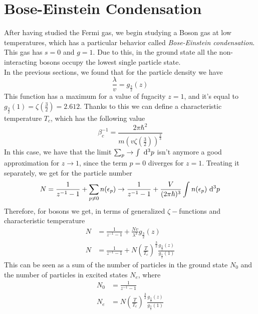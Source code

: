 \documentclass[../qm.tex]{subfiles}
\begin{document}
	\section{Bose-Einstein Condensation}
	After having studied the Fermi gas, we begin studying a Boson gas at low temperatures, which has a particular behavior called \textit{Bose-Einstein condensation}. This gas has $s=0$ and $g=1$. Due to this, in the ground state all the non-interacting bosons occupy the lowest single particle state.\\
	In the previous sections, we found that for the particle density we have
	\begin{equation}
		\frac{\lambda}{v}=g_{\frac{3}{2}}(z)
		\label{eq:particledensity}
	\end{equation}
	This function has a maximum for a value of fugacity $z=1$, and it's equal to $g_{\frac{3}{2}}(1)=\zeta(\frac{3}{2})=2.612$. Thanks to this we can define a characteristic temperature $T_c$, which has the following value
	\begin{equation}
		\beta_c^{-1}=\frac{2\pi\hbar^2}{m(v\zeta(\frac{3}{2}))^{\frac{2}{3}}}
		\label{eq:characteristictemp}
	\end{equation}
	In this case, we have that the limit $\sum_p\to\int\diff[3]{p}$ isn't anymore a good approximation for $z\to1$, since the term $p=0$ diverges for $z=1$. Treating it separately, we get for the particle number
	\begin{equation}
		N=\frac{1}{z^{-1}-1}+\sum_{p\ne0}n(\epsilon_p)\to\frac{1}{z^{-1}-1}+\frac{V}{(2\pi\hbar)^3}\int_{}^{}n(\epsilon_p)\diff[3]{p}
		\label{eq:bosonpnumb}
	\end{equation}
	Therefore, for bosons we get, in terms of generalized $\zeta-$functions and characteristic temperature
	\begin{equation}
		\begin{aligned}
			N&=\frac{1}{z^{-1}-1}+\frac{Nv}{\lambda^3}g_{\frac{3}{2}}(z)\\
			N&=\frac{1}{z^{-1}-1}+N\left( \frac{T}{T_c} \right)^{\frac{3}{2}}\frac{g_{\frac{3}{2}}(z)}{g_{\frac{3}{2}}(1)}
		\end{aligned}
		\label{eq:bosonparticlen}
	\end{equation}
	This can be seen as a sum of the number of particles in the ground state $N_0$ and the number of particles in excited states $N_e$, where
	\begin{equation}
		\begin{aligned}
			N_0&=\frac{1}{z^{-1}-1}\\
			N_e&=N\left( \frac{T}{T_c} \right)^{\frac{3}{2}}\frac{g_{\frac{3}{2}}(z)}{g_{\frac{3}{2}}(1)}
		\end{aligned}
		\label{eq:particlenumbergses}
	\end{equation}
\end{document}
